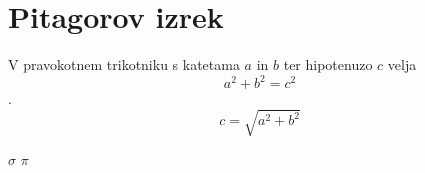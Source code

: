 \documentclass{article}
\begin{document}
\section*{Pitagorov izrek}
V pravokotnem trikotniku s katetama \(a\) in \(b\) ter hipotenuzo \(c\) velja
\[ a^2 + b^2 = c^2 \].
\[ c = \sqrt{a^2 + b^2}\]

$\sigma$
$\pi$
$\frac{}{}$
\end{document}
